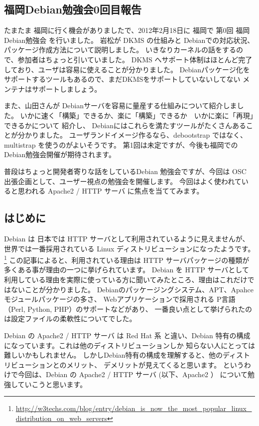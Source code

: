 \documentclass[mingoth,a4paper]{jsarticle}
\begin{document}
\subsection{福岡Debian勉強会0回目報告}
たまたま 福岡に行く機会がありましたで、2012年2月18日に 福岡で 第0回 福岡Debian勉強会
を行いました。
岩松が DKMS の仕組みと Debianでの対応状況、パッケージ作成方法について説明しました。
いきなりカーネルの話をするので、参加者はちょっと引いていました。
DKMS へサポート体制はほとんど完了しており、ユーザは容易に使えることが分かりました。
Debianパッケージ化をサポートするツールもあるので、まだDKMSをサポートしていないしてない
メンテナはサポートしましょう。

また、山田さんが Debianサーバを容易に量産する仕組みについて紹介しました。
いかに速く「構築」できるか、楽に「構築」できるか　いかに楽に「再現」できるかについて
紹介し、 Debianにはこれらを満たすツールがたくさんあることが分かりました。
ユーザランドイメージ作るなら、debootstrap ではなく、multistrap 
を使うのがよいそうです。
第1回は未定ですが、今後も福岡でのDebian勉強会開催が期待されます。



普段はちょっと開発者寄りな話をしているDebian
勉強会ですが、今回は OSC 出張企画として、ユーザー視点の勉強会を開催します。
今回はよく使われていると思われる Apache2 / HTTP サーバ に焦点を当ててみます。

\subsection{はじめに}

Debian は 日本では HTTP サーバとして利用されているように見えませんが、
世界では一番採用されている Linux ディストリビューションになったようです。
\footnote{\url{http://w3techs.com/blog/entry/debian_is_now_the_most_popular_linux_distribution_on_web_servers}}
この記事によると、利用されている理由は HTTP サーバパッケージの種類が多くある事が理由の一つに挙げられています。
Debian を HTTP サーバとして利用している理由を実際に使っている方に聞いてみたところ、理由はこれだけではないことが分かりました。
Debianのパッケージングシステム、APT、Apahce モジュールパッケージの多さ、
Webアプリケーションで採用される P言語（Perl, Python, PHP）のサポートなどがあり、
一番良い点として挙げられたのは設定ファイルの柔軟性についてでした。

Debian の Apache2 / HTTP サーバ は Red Hat 系 と違い、Debian 特有の構成になっています。これは他のディストリビューションしか
知らない人にとっては難しいかもしれません。
しかしDebian特有の構成を理解すると、他のディストリビューションとのメリット、
デメリットが見えてくると思います。
というわけで今回は、Debian の Apache2 / HTTP サーバ (以下、Apache2 ） について勉強していこうと思います。
\end{document}
